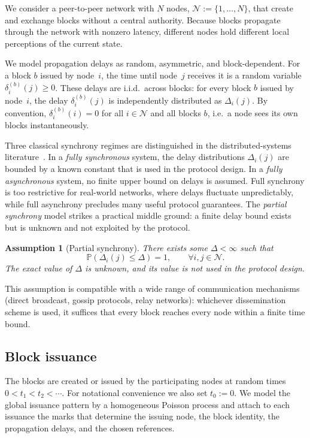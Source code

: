 \documentclass[a4paper,12pt,oneside,reqno]{amsart}
\newcommand{\Nodes}{{\mathcal N}}
\newcommand{\block}{{b}}
\renewcommand{\P}{{\mathbb P}}
\newcommand{\1}{{\mathbf 1}}
\newcommand{\delay}{{\delta}}
\newtheorem{ass}[theo]{Assumption}
\begin{document}
We consider a peer-to-peer network with $N$ nodes, $\Nodes:=\{1,\ldots, N\}$, that create and exchange blocks without a central authority. Because blocks propagate through the network with nonzero latency, different nodes hold different local perceptions of the current state.

We model propagation delays as random, asymmetric, and block-dependent. For a block $\block$ issued by node~$i$, the time until node~$j$ receives it is a random variable $\delay_{i}^{(\block)}(j)\ge 0$. These delays are i.i.d.\ across blocks: for every block $\block$ issued by node~$i$, the delay $\delay_{i}^{(\block)}(j)$ is independently distributed as $\Delta_{i}(j)$. By convention, $\delay_{i}^{(\block)}(i)=0$ for all $i\in\Nodes$ and all blocks $\block$, i.e.\ a node sees its own blocks instantaneously.

Three classical synchrony regimes are distinguished in the distributed-systems literature~\cite{DwLySt:88}. In a \emph{fully synchronous} system, the delay distributions $\Delta_{i}(j)$ are bounded by a known constant that is used in the protocol design. In a \emph{fully asynchronous} system, no finite upper bound on delays is assumed. Full synchrony is too restrictive for real-world networks, where delays fluctuate unpredictably, while full asynchrony precludes many useful protocol guarantees. The \emph{partial synchrony} model strikes a practical middle ground: a finite delay bound exists but is unknown and not exploited by the protocol.

\begin{ass}[Partial synchrony]\label{ass:sync}
There exists some $\Delta<\infty$ such that
\[
\P( \Delta_{i}(j)\leq \Delta)=1, \qquad \forall i,j \in \Nodes.
\] The exact value of $\Delta$ is unknown, and its value is not used in the protocol design.
\end{ass}
This assumption is compatible with a wide range of communication mechanisms (direct broadcast, gossip protocols, relay networks): whichever dissemination scheme is used, it suffices that every block reaches every node within a finite time bound.

\subsection{Block issuance}

The blocks are created or issued by the participating nodes at random times $0<t_1<t_2<\cdots$. For notational convenience we also set $t_0:=0$. We model the global issuance pattern by a homogeneous Poisson process and attach to each issuance the marks that determine the issuing node, the block identity, the propagation delays, and the chosen references.
\end{document}
